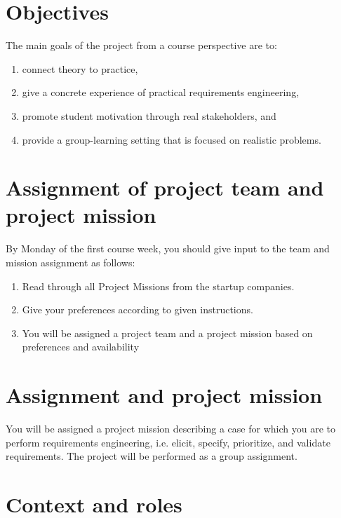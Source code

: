 \maketitle
\vspace{-1cm}

\section{Objectives}
The main goals of the project from a course perspective are to:
\begin{enumerate}[noitemsep]
\item connect theory to practice,
\item give a concrete experience of practical requirements engineering,
\item promote student motivation through real stakeholders, and
\item provide a group-learning setting that is focused on realistic problems.
\end{enumerate}

\ifteknolog
   \section{Assignment of project team and project mission}
   By Monday of the first course week, you should give input to the team and mission
assignment as follows:
\begin{enumerate}[noitemsep]
   \item Read through all Project Missions from the startup companies.
   \item  Give your preferences according to given instructions.
   \item  You will be assigned a project team and a project mission based on preferences
   and availability
\end{enumerate}
\else
   \section{Assignment and project mission}
   You will be assigned a project mission describing a case for which you are to perform requirements engineering, i.e. elicit, specify, prioritize, and validate requirements. The project will be performed as a group assignment.
\fi

\ifteknolog
   \section{Context and roles}

